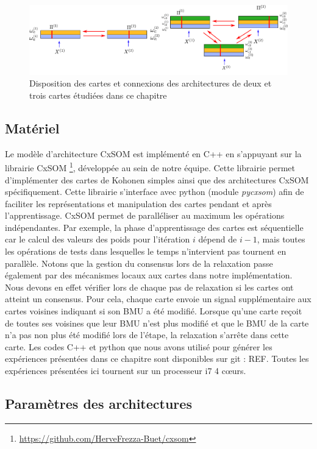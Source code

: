 \documentclass[../main]{subfiles}
\begin{document}
\begin{figure}
	\includegraphics[width=\textwidth]{archis.pdf}
	\caption{Disposition des cartes et connexions des architectures de deux et trois cartes étudiées dans ce chapitre \label{fig:archis}}
\end{figure}

\subsection{Matériel}

Le modèle d'architecture CxSOM est implémenté en C++ en s'appuyant sur la librairie CxSOM \footnote{\url{https://github.com/HerveFrezza-Buet/cxsom}}, développée au sein de notre équipe.
Cette librairie permet d'implémenter des cartes de Kohonen simples ainsi que des architectures CxSOM spécifiquement.
Cette librairie s'interface avec python (module \emph{pycxsom}) afin de faciliter les représentations et manipulation des cartes pendant et après l'apprentissage. 
CxSOM permet de paralléliser au maximum les opérations indépendantes. Par exemple, la phase d'apprentissage des cartes est séquentielle car le calcul des valeurs des poids pour l'itération $i$ dépend de $i-1$, mais toutes les opérations de tests dans lesquelles le temps n'intervient pas tournent en parallèle.
Notons que la gestion du consensus lors de la relaxation passe également par des mécanismes locaux aux cartes dans notre implémentation. 
Nous devons en effet vérifier lors de chaque pas de relaxation si les cartes ont atteint un consensus. Pour cela, chaque carte envoie un signal supplémentaire aux cartes voisines indiquant si son BMU a été modifié. Lorsque qu'une carte reçoit de toutes ses voisines que leur BMU n'est plus modifié et que le BMU de la carte n'a pas non plus été modifié lors de l'étape, la relaxation s'arrête dans cette carte.
Les codes C++ et python que nous avons utilisé pour générer les expériences présentées dans ce chapitre sont disponibles sur git : REF.
Toutes les expériences présentées ici tournent sur un processeur i7 4 c\oe{}urs.

\subsection{Paramètres des architectures}
\end{document}
